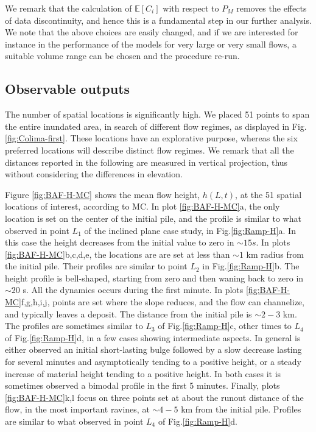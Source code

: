 \documentclass{article}
\begin{document}
We remark that the calculation of $\mathbb E[C_i]$ with respect to $P_M$ removes the effects of data discontinuity, and hence this is a fundamental step in our further analysis. We note that the above choices are easily changed, and if we are interested for instance in the performance of the models for very large or very small flows, a suitable volume range can be chosen and the procedure re-run.

\subsection{Observable outputs}
The number of spatial locations is significantly high. We placed 51 points to span the entire inundated area, in search of different flow regimes, as displayed in Fig. \ref{fig:Colima-first}. These locations have an explorative purpose, whereas the six preferred locations will describe distinct flow regimes. We remark that all the distances reported in the following are measured in vertical projection, thus without considering the differences in elevation.

Figure \ref{fig:BAF-H-MC} shows the mean flow height, $h(L,t)$, at the 51 spatial locations of interest, according to MC. In plot \ref{fig:BAF-H-MC}a, the only location is set on the center of the initial pile, and the profile is similar to what observed in point $L_1$ of the inclined plane case study, in Fig.\ref{fig:Ramp-H}a. In this case the height decreases from the initial value to zero in $\sim 15 s$. In plots \ref{fig:BAF-H-MC}b,c,d,e, the locations are are set at less than $\sim 1$ km radius from the initial pile. Their profiles are similar to point $L_2$ in Fig.\ref{fig:Ramp-H}b. The height profile is bell-shaped, starting from zero and then waning back to zero in $\sim 20$ s. All the dynamics occurs during the first minute. In plots \ref{fig:BAF-H-MC}f,g,h,i,j, points are set where the slope reduces, and the flow can channelize, and typically leaves a deposit. The distance from the initial pile is $\sim 2-3$ km. The profiles are sometimes similar to $L_3$ of Fig.\ref{fig:Ramp-H}c, other times to $L_4$ of Fig.\ref{fig:Ramp-H}d, in a few cases showing intermediate aspects. In general is either observed an initial short-lasting bulge followed by a slow decrease lasting for several minutes and asymptotically tending to a positive height, or a steady increase of material height tending to a positive height. In both cases it is sometimes observed a bimodal profile in the first 5 minutes. Finally, plots \ref{fig:BAF-H-MC}k,l focus on three points set at about the runout distance of the flow, in the most important ravines, at $\sim 4-5$ km from the initial pile. Profiles are similar to what observed in point $L_4$ of Fig.\ref{fig:Ramp-H}d.
\end{document}
